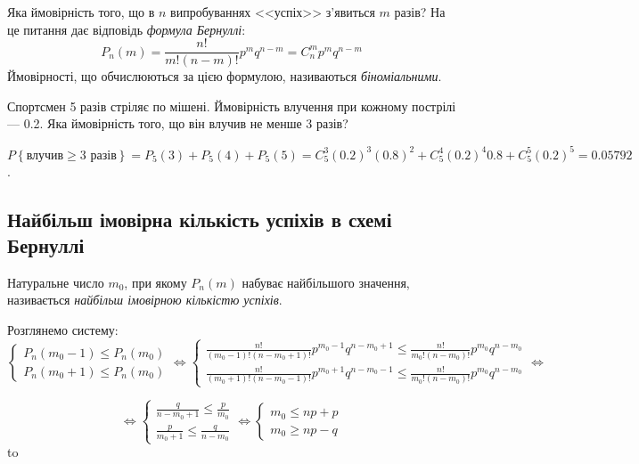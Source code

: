 Яка ймовірність того, що в $n$ випробуваннях <<успіх>> з'явиться $m$ разів?
На це питання дає відповідь \emph{формула Бернуллі}:
\begin{equation}
    P_n(m) = \frac{n!}{m!(n-m)!}p^mq^{n-m} = 
    C_n^m p^m q^{n-m}
\end{equation}
Ймовірності, що обчислюються за цією формулою, називаються \emph{біноміальними}.

\begin{example}\label{ex:sportsman}
    Спортсмен 5 разів стріляє по мішені. Ймовірність влучення при кожному пострілі --- 0.2. 
    Яка ймовірність того, що він влучив не менше 3 разів?

    $P\left\{\text{влучив} \geq  \text{3 разів} \right\} = P_5(3) + P_5(4) + P_5(5) = 
    C_5^3 (0.2)^3 (0.8)^2 + C_5^4 (0.2)^4 0.8 + C_5^5 (0.2)^5 = 0.05792$.
\end{example}
\subsection{Найбільш імовірна кількість успіхів в схемі Бернуллі}
\begin{definition}
    Натуральне число $m_0$, при якому $P_n(m)$ набуває найбільшого значення, 
    називається \emph{найбільш імовірною кількістю успіхів}.
\end{definition}

Розглянемо систему:
$$\begin{cases}
    P_n(m_0 - 1) \leq P_n(m_0)\\
    P_n(m_0 + 1) \leq P_n(m_0)
\end{cases}
\Leftrightarrow 
\begin{cases}
    \frac{n!}{(m_0 - 1)!(n-m_0+1)!} p^{m_0 - 1} q^{n - m_0 + 1} 
    \leq 
    \frac{n!}{m_0!(n-m_0)!} p^{m_0} q^{n - m_0}\\
    \frac{n!}{(m_0 + 1)!(n-m_0-1)!} p^{m_0 + 1} q^{n - m_0 - 1} 
    \leq 
    \frac{n!}{m_0!(n-m_0)!} p^{m_0} q^{n - m_0}
\end{cases}
\Leftrightarrow
$$

$$
\Leftrightarrow
\begin{cases}
    \frac{q}{n-m_0+1} \leq \frac{p}{m_0} \\
    \frac{p}{m_0 + 1} \leq \frac{q}{n-m_0}
\end{cases}
\Leftrightarrow
\begin{cases}
    m_0 \leq np+p\\
    m_0 \geq np-q
\end{cases}
$$
\hbox to 

